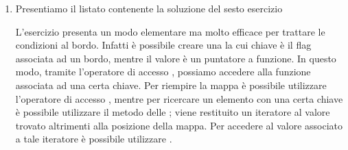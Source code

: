 \begin{enumerate}
	\item Presentiamo il listato contenente la soluzione del sesto esercizio
		\lstset{basicstyle=\scriptsize\sf}
		
		\lstset{basicstyle=\sf}	
		L'esercizio presenta un modo elementare ma molto efficace per trattare le condizioni al bordo. 
		Infatti \`e possibile creare una  la cui chiave \`e il flag associata ad un bordo, mentre
		il valore \`e un puntatore a funzione. In questo modo, tramite l'operatore di accesso \cpp{[]}, 
		possiamo accedere alla funzione associata ad una certa chiave. Per riempire la mappa \`e possibile
		utilizzare l'operatore di accesso \cpp{[]}, mentre per ricercare un elemento con una certa chiave
		\`e possibile utilizzare il metodo  delle ; viene restituito un iteratore al
		valore trovato altrimenti alla posizione  della mappa. Per accedere al valore associato
		a tale iteratore \`e possibile utilizzare .
	
\end{enumerate}